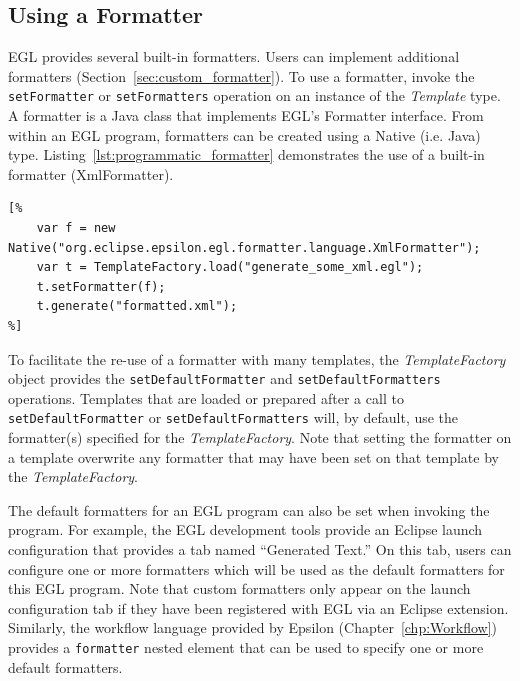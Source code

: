 \subsection{Using a Formatter}
EGL provides several built-in formatters. Users can implement additional 
formatters (Section~\ref{sec:custom_formatter}). To use a formatter, 
invoke the \texttt{setFo\-rm\-at\-t\-er} or \texttt{setFo\-rm\-at\-te\-rs} 
operation on an instance of the \emph{Template} type. A formatter is a
Java class that implements EGL's Formatter interface. From within an 
EGL program, formatters can be created using a Native (i.e. Java) type.
Listing~\ref{lst:programmatic_formatter} demonstrates the use of a 
built-in formatter (XmlFormatter).

\begin{lstlisting}[basicstyle=\ttfamily\footnotesize, language=EGL, tabsize=2, flexiblecolumns=true, caption=Using a formatter from within an EGL program., label=lst:programmatic_formatter]
[%
	var f = new Native("org.eclipse.epsilon.egl.formatter.language.XmlFormatter");
	var t = TemplateFactory.load("generate_some_xml.egl");
	t.setFormatter(f);
	t.generate("formatted.xml");
%]
\end{lstlisting}

To facilitate the re-use of a formatter with many templates, the
\emph{TemplateFactory} object provides the 
\texttt{setDe\-fa\-u\-ltFo\-rm\-at\-ter} and \texttt{setDe\-fa\-u\-ltFo\-rm\-at\-ters}
operations. Templates that are loaded or prepared after a call to
\texttt{setDe\-fa\-u\-ltFo\-rm\-at\-ter} or \texttt{setDe\-fa\-u\-ltFo\-rm\-at\-ters}
will, by default, use the formatter(s) specified for the \emph{TemplateFactory}.
Note that setting the formatter on a template overwrite any formatter 
that may have been set on that template by the \emph{TemplateFactory}.

The default formatters for an EGL program can also be set when invoking the
program. For example, the EGL development tools provide an Eclipse launch configuration that provides a tab named ``Generated Text.'' On this tab, users can configure
one or more formatters which will be used as the default formatters for this 
EGL program. Note that custom formatters only appear on the launch configuration 
tab if they have been registered with EGL via an Eclipse extension. Similarly, the workflow language provided by Epsilon (Chapter~\ref{chp:Workflow}) provides a \texttt{for\-ma\-tt\-er} nested element that can be used to specify one or more
default formatters.

